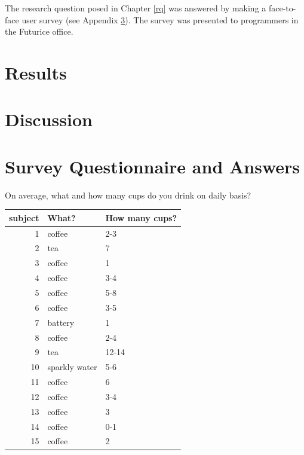\documentclass[a4paper,12pt]{article}
\begin{document}
The research question posed in Chapter \ref{rq} was answered by making
a face-to-face user survey (see Appendix \ref{survey}). The survey was
presented to programmers in the Futurice office.

\section{Results}



\section{Discussion}


\clearpage
\appendix
\section{Survey Questionnaire and Answers}
\label{survey}

On average, what and how many cups do you drink on daily basis?\\

\begin{tabular}{|r|l|l|}
  \hline
  \textbf{subject} & \textbf{What?} & \textbf{How many cups?} \\
  \hline
  1 & coffee & 2-3 \\
  2 & tea & 7 \\
  3 & coffee & 1 \\
  4 & coffee & 3-4 \\
  5 & coffee & 5-8 \\
  6 & coffee & 3-5 \\
  7 & battery & 1 \\
  8 & coffee & 2-4 \\
  9 & tea & 12-14 \\
  10 & sparkly water & 5-6 \\
  11 & coffee & 6 \\
  12 & coffee & 3-4 \\
  13 & coffee & 3 \\
  14 & coffee & 0-1 \\
  15 & coffee & 2 \\
  \hline
\end{tabular}
\end{document}
